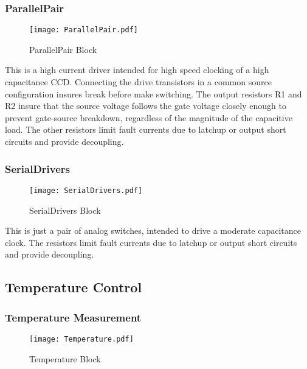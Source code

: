 \documentclass[a4paper,12pt]{article}
\begin{document}
\subsubsection{ParallelPair}

   \begin{figure}
   \begin{center}
   \texttt{[image: ParallelPair.pdf]}
   \end{center}
   \caption{ParallelPair Block}
   \end{figure}

This is a high current driver intended for high speed clocking of a high capacitance CCD. Connecting the drive transistors in a common source configuration insures break before make switching. The output resistors R1 and R2 insure that the source voltage follows the gate voltage closely enough to prevent gate-source breakdown, regardless of the magnitude of the capacitive load. The other resistors limit fault currents due to latchup or output short circuits and provide decoupling.

\subsubsection{SerialDrivers}
   \begin{figure}
   \begin{center}
   \texttt{[image: SerialDrivers.pdf]}
   \end{center}
   \caption{SerialDrivers Block}
   \end{figure}
   
This is just a pair of analog switches, intended to drive a moderate capacitance clock. The resistors limit fault currents due to latchup or output short circuits and provide decoupling.

\subsection{Temperature Control}

\subsubsection{Temperature Measurement}
   \begin{figure}
   \begin{center}
   \texttt{[image: Temperature.pdf]}
   \end{center}
   \caption{Temperature Block}
   \end{figure}
   
\end{document}
